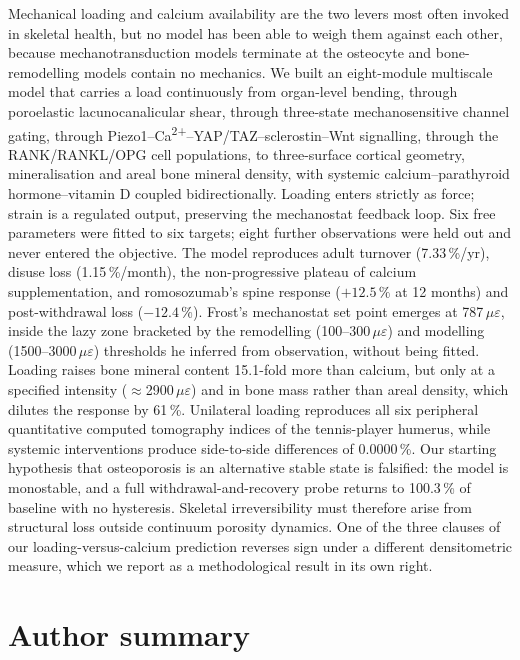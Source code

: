 \documentclass[10pt,letterpaper]{article}
\newcommand{\ue}{\ensuremath{\mu\varepsilon}}
\begin{document}
Mechanical loading and calcium availability are the two levers most often
invoked in skeletal health, but no model has been able to weigh them against
each other, because mechanotransduction models terminate at the osteocyte and
bone-remodelling models contain no mechanics. We built an eight-module
multiscale model that carries a load continuously from organ-level bending,
through poroelastic lacunocanalicular shear, through three-state
mechanosensitive channel gating, through
Piezo1--Ca\textsuperscript{2+}--YAP/TAZ--sclerostin--Wnt signalling, through
the RANK/RANKL/OPG cell populations, to three-surface cortical geometry,
mineralisation and areal bone mineral density, with systemic
calcium--parathyroid hormone--vitamin D coupled bidirectionally. Loading
enters strictly as force; strain is a regulated output, preserving the
mechanostat feedback loop. Six free parameters were fitted to six targets;
eight further observations were held out and never entered the objective. The
model reproduces adult turnover (7.33\,\%/yr), disuse loss (1.15\,\%/month),
the non-progressive plateau of calcium supplementation, and romosozumab's
spine response ($+12.5\,\%$ at 12 months) and post-withdrawal loss
($-12.4\,\%$). Frost's mechanostat set point emerges at 787\,\ue, inside the
lazy zone bracketed by the remodelling (100--300\,\ue) and modelling
(1500--3000\,\ue) thresholds he inferred from observation, without being
fitted. Loading raises bone mineral content 15.1-fold more than calcium, but
only at a specified intensity ($\approx$2900\,\ue) and in bone mass rather
than areal density, which dilutes the response by 61\,\%. Unilateral loading
reproduces all six peripheral quantitative computed tomography indices of the
tennis-player humerus, while systemic interventions produce side-to-side
differences of 0.0000\,\%. Our starting hypothesis that osteoporosis is
an alternative stable state is falsified: the model is monostable, and a full
withdrawal-and-recovery probe returns to 100.3\,\% of baseline with no
hysteresis. Skeletal irreversibility must therefore arise from structural loss
outside continuum porosity dynamics. One of the three clauses of our
loading-versus-calcium prediction reverses sign under a different densitometric
measure, which we report as a methodological result in its own right.

\section*{Author summary}
\end{document}
